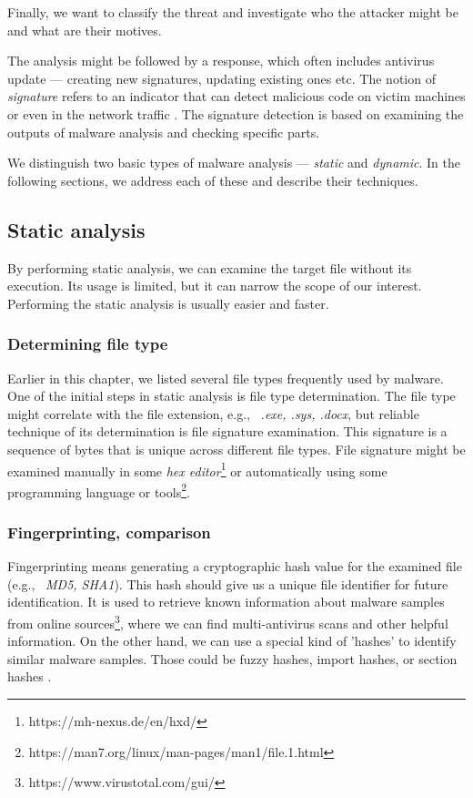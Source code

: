 Finally, we want to classify the threat and investigate who the attacker might be and what are their motives.

The analysis might be followed by a response, which often includes antivirus update --- creating new signatures, updating existing ones etc. The notion of \emph{signature} refers to an indicator that can detect malicious code on victim machines or even in the network traffic \cite{Sikorski2012}. The signature detection is based on examining the outputs of malware analysis and checking specific parts.

We distinguish two basic types of malware analysis --- \emph{static} and \emph{dynamic}. In the following sections, we address each of these and describe their techniques.

\subsection{Static analysis}
By performing static analysis, we can examine the target file without its execution. Its usage is limited, but it can narrow the scope of our interest. \cite{KA2018} Performing the static analysis is usually easier and faster. \cite{Sikorski2012}

\subsubsection*{Determining file type}
Earlier in this chapter, we listed several file types frequently used by malware. One of the initial steps in static analysis is file type determination. The file type might correlate with the file extension, e.g., \ \emph{.exe, .sys, .docx}, but reliable technique of its determination is file signature examination. This signature is a sequence of bytes that is unique across different file types. File signature might be examined manually in some \emph{hex editor}\footnote{https://mh-nexus.de/en/hxd/} or automatically using some programming language or tools\footnote{https://man7.org/linux/man-pages/man1/file.1.html}. \cite{KA2018} 


\subsubsection*{Fingerprinting, comparison}
Fingerprinting means generating a cryptographic hash value for the examined file (e.g., \ \emph{MD5, SHA1}). This hash should give us a unique file identifier for future identification. It is used to retrieve known information about malware samples from online sources\footnote{https://www.virustotal.com/gui/}, where we can find multi-antivirus scans and other helpful information. On the other hand, we can use a special kind of 'hashes' to identify similar malware samples. Those could be fuzzy hashes, import hashes, or section hashes \cite{KA2018}.

